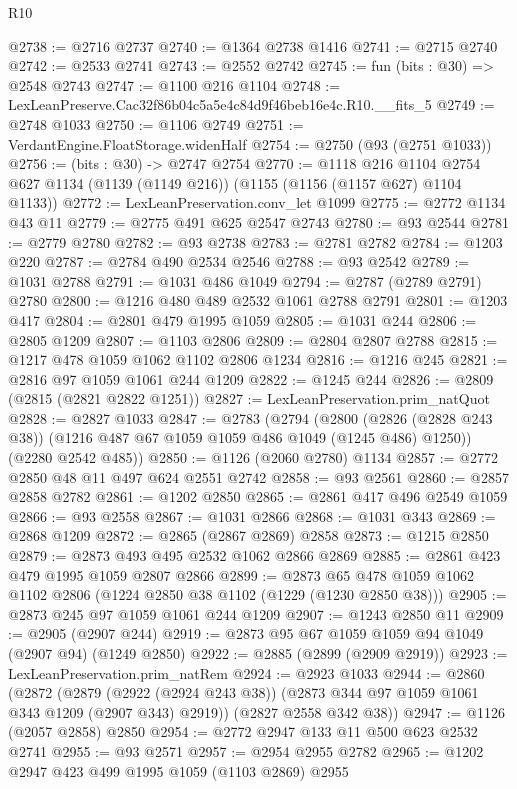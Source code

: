 \begin{lexlean}{R10}
\begin{coremodule}
@2738 := @2716 @2737
@2740 := @1364 @2738 @1416
@2741 := @2715 @2740
@2742 := @2533 @2741
@2743 := @2552 @2742
@2745 := fun (bits : @30) => @2548 @2743
@2747 := @1100 @216 @1104
@2748 := LexLeanPreserve.Cac32f86b04c5a5e4c84d9f46beb16e4c.R10.__fits_5
@2749 := @2748 @1033
@2750 := @1106 @2749
@2751 := VerdantEngine.FloatStorage.widenHalf
@2754 := @2750 (@93 (@2751 @1033))
@2756 := (bits : @30) -> @2747 @2754
@2770 := @1118
    @216
    @1104
    @2754
    @627
    @1134
    (@1139 (@1149 @216))
    (@1155 (@1156 (@1157 @627) @1104 @1133))
@2772 := LexLeanPreservation.conv_let @1099
@2775 := @2772 @1134 @43 @11
@2779 := @2775 @491 @625 @2547 @2743
@2780 := @93 @2544
@2781 := @2779 @2780
@2782 := @93 @2738
@2783 := @2781 @2782
@2784 := @1203 @220
@2787 := @2784 @490 @2534 @2546
@2788 := @93 @2542
@2789 := @1031 @2788
@2791 := @1031 @486 @1049
@2794 := @2787 (@2789 @2791) @2780
@2800 := @1216 @480 @489 @2532 @1061 @2788 @2791
@2801 := @1203 @417
@2804 := @2801 @479 @1995 @1059
@2805 := @1031 @244
@2806 := @2805 @1209
@2807 := @1103 @2806
@2809 := @2804 @2807 @2788
@2815 := @1217 @478 @1059 @1062 @1102 @2806 @1234
@2816 := @1216 @245
@2821 := @2816 @97 @1059 @1061 @244 @1209
@2822 := @1245 @244
@2826 := @2809 (@2815 (@2821 @2822 @1251))
@2827 := LexLeanPreservation.prim_natQuot
@2828 := @2827 @1033
@2847 := @2783
    (@2794
      (@2800 (@2826 (@2828 @243 @38)) (@1216 @487 @67 @1059 @1059 @486 @1049 (@1245 @486) @1250))
      (@2280 @2542 @485))
@2850 := @1126 (@2060 @2780) @1134
@2857 := @2772 @2850 @48 @11 @497 @624 @2551 @2742
@2858 := @93 @2561
@2860 := @2857 @2858 @2782
@2861 := @1202 @2850
@2865 := @2861 @417 @496 @2549 @1059
@2866 := @93 @2558
@2867 := @1031 @2866
@2868 := @1031 @343
@2869 := @2868 @1209
@2872 := @2865 (@2867 @2869) @2858
@2873 := @1215 @2850
@2879 := @2873 @493 @495 @2532 @1062 @2866 @2869
@2885 := @2861 @423 @479 @1995 @1059 @2807 @2866
@2899 := @2873 @65 @478 @1059 @1062 @1102 @2806 (@1224 @2850 @38 @1102 (@1229 (@1230 @2850 @38)))
@2905 := @2873 @245 @97 @1059 @1061 @244 @1209
@2907 := @1243 @2850 @11
@2909 := @2905 (@2907 @244)
@2919 := @2873 @95 @67 @1059 @1059 @94 @1049 (@2907 @94) (@1249 @2850)
@2922 := @2885 (@2899 (@2909 @2919))
@2923 := LexLeanPreservation.prim_natRem
@2924 := @2923 @1033
@2944 := @2860
    (@2872
      (@2879 (@2922 (@2924 @243 @38)) (@2873 @344 @97 @1059 @1061 @343 @1209 (@2907 @343) @2919))
      (@2827 @2558 @342 @38))
@2947 := @1126 (@2057 @2858) @2850
@2954 := @2772 @2947 @133 @11 @500 @623 @2532 @2741
@2955 := @93 @2571
@2957 := @2954 @2955 @2782
@2965 := @1202 @2947 @423 @499 @1995 @1059 (@1103 @2869) @2955

\end{coremodule}
\end{lexlean}
